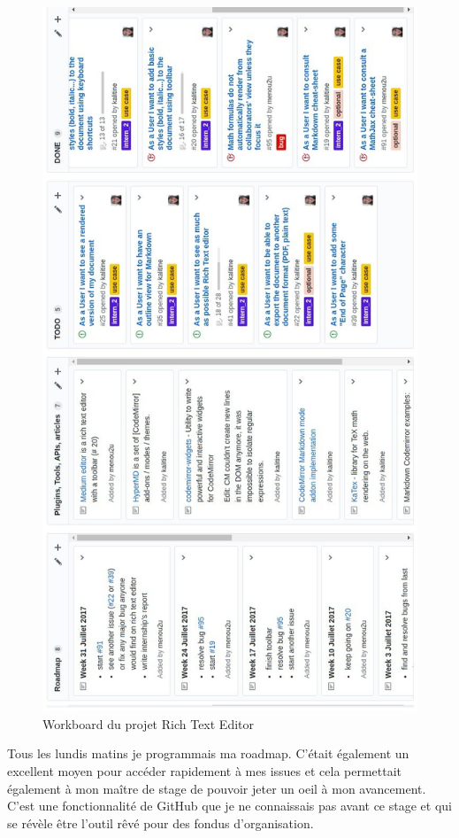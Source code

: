 \documentclass[12pt]{article}
\begin{document}
\newpage
\begin{figure}[H]
\centering
\includegraphics[scale=0.52]{gallery/workboard.jpg}
\caption[nom dans le sommaire]{Workboard du projet Rich Text Editor}
\label{fig:gallery1}
\end{figure}

\newpage
Tous les lundis matins je programmais ma roadmap. C'était également un excellent moyen pour accéder rapidement à mes issues et cela permettait également à mon maître de stage de pouvoir jeter un oeil à mon avancement. C'est une fonctionnalité de GitHub que je ne connaissais pas avant ce stage et qui se révèle être l'outil rêvé pour des fondus d'organisation.\\
\end{document}
